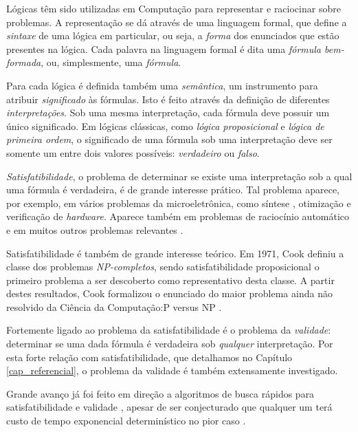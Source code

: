 \indent

Lógicas têm sido utilizadas em Computação para representar e raciocinar sobre problemas. A representação se dá através de uma linguagem formal, que define a \emph{sintaxe} de uma lógica em particular, ou seja, a \emph{forma} dos enunciados que estão presentes na lógica. Cada palavra na linguagem formal é dita uma \emph{fórmula bem-formada}, ou, simplesmente, uma \emph{fórmula}.

Para cada lógica é definida também uma \emph{semântica}, um instrumento para atribuir \emph{significado} às fórmulas. Isto é feito através da definição de diferentes \emph{interpretações}. Sob uma mesma interpretação, cada fórmula deve possuir um único significado. Em lógicas clássicas, como \emph{lógica proposicional} e \emph{lógica de primeira ordem}, o significado de uma fórmula sob uma interpretação deve ser somente um entre dois valores possíveis: \emph{verdadeiro} ou \emph{falso}.

\emph{Satisfatibilidade}, o problema de determinar se existe uma interpretação sob a qual uma fórmula é verdadeira, é de grande interesse prático. Tal problema aparece, por exemplo, em vários problemas da microeletrônica, como síntese \cite{bloem2014sat}, otimização \cite{gupta2006sat} e verificação \cite{nieuwenhuis2006sat} de \textit{hardware}. Aparece também em problemas de raciocínio automático \cite{harrison2009handbook} e em muitos outros problemas relevantes \cite{horvitz1992automated}.

Satisfatibilidade é também de grande interesse teórico. Em 1971, Cook definiu a classe dos problemas \emph{NP-completos}, sendo satisfatibilidade proposicional o primeiro problema a ser descoberto como representativo desta classe. A partir destes resultados, Cook formalizou o enunciado do maior problema ainda não resolvido da Ciência da Computação:\break P versus NP \cite{cook1971complexity}.

Fortemente ligado ao problema da satisfatibilidade é o problema da \emph{validade}: determinar se uma dada fórmula é verdadeira sob \emph{qualquer} interpretação. Por esta forte relação com satisfatibilidade, que detalhamos no Capítulo \ref{cap_referencial}, o problema da validade é também extensamente investigado.

Grande avanço já foi feito em direção a algoritmos de busca rápidos para satisfatibilidade e validade \cite{davis1960computing,davis1962machine,biere2009conflict}, apesar de ser conjecturado que qualquer um terá custo de tempo exponencial determinístico no pior caso \cite{cook1971complexity}.

